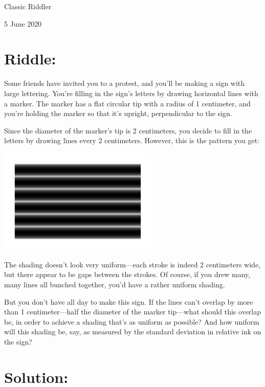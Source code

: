 \documentclass{article}
\begin{document}
\pagestyle{empty} %

\begin{center}
{\LARGE Classic Riddler}

\vspace{0.15in}

{\Large 5 June 2020}
\end{center}


\section*{Riddle:}

Some friends have invited you to a protest, and you'll be making a sign with large lettering.
You're filling in the sign's letters by drawing horizontal lines with a marker.
The marker has a flat circular tip with a radius of 1 centimeter, and you're holding the marker so that it's upright, perpendicular to the sign.

Since the diameter of the marker's tip is 2 centimeters, you decide to fill in the letters by drawing lines every 2 centimeters.
However, this is the pattern you get:

\begin{center}
\includegraphics[width=3in]{poster.png}
\end{center}

The shading doesn't look very uniform---each stroke is indeed 2 centimeters wide, but there appear to be gaps between the strokes.
Of course, if you drew many, many lines all bunched together, you'd have a rather uniform shading.

But you don't have all day to make this sign.
If the lines can't overlap by more than 1 centimeter---half the diameter of the marker tip---what should this overlap be, in order to achieve a shading that's as uniform as possible?
And how uniform will this shading be, say, as measured by the standard deviation in relative ink on the sign?

\section*{Solution:}
\end{document}

